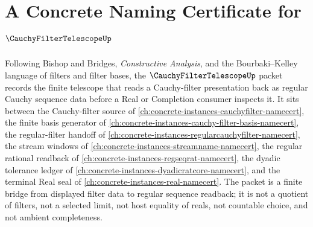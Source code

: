 \chapter{A Concrete Naming Certificate for $\CauchyFilterTelescopeUp$}
\label{ch:concrete-instances-cauchy-filter-telescope-namecert}

Following Bishop and Bridges, \emph{Constructive Analysis}, and the Bourbaki--Kelley language of filters and filter bases, the $\CauchyFilterTelescopeUp$ packet records the finite telescope that reads a Cauchy-filter presentation back as regular Cauchy sequence data before a Real or Completion consumer inspects it. It sits between the Cauchy-filter source of \autoref{ch:concrete-instances-cauchyfilter-namecert}, the finite basis generator of \autoref{ch:concrete-instances-cauchy-filter-basis-namecert}, the regular-filter handoff of \autoref{ch:concrete-instances-regularcauchyfilter-namecert}, the stream windows of \autoref{ch:concrete-instances-streamname-namecert}, the regular rational readback of \autoref{ch:concrete-instances-regseqrat-namecert}, the dyadic tolerance ledger of \autoref{ch:concrete-instances-dyadicratcore-namecert}, and the terminal Real seal of \autoref{ch:concrete-instances-real-namecert}. The packet is a finite bridge from displayed filter data to regular sequence readback; it is not a quotient of filters, not a selected limit, not host equality of reals, not countable choice, and not ambient completeness.

